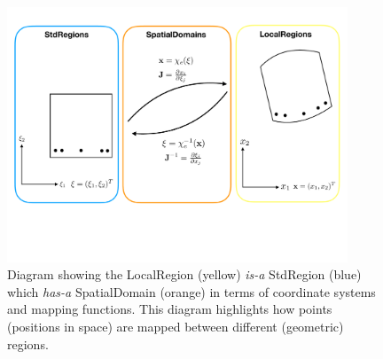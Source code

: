 \begin{figure}[htb]
\centering
\includegraphics[width=4in]{img/stdtolocal.pdf}
\caption{Diagram showing the LocalRegion (yellow) {\em is-a} StdRegion (blue) which {\em has-a} SpatialDomain (orange) in terms of coordinate systems and mapping functions. This diagram highlights how points (positions in space) are mapped between different (geometric) regions.}
\label{intro:stdtolocal}
\end{figure}

